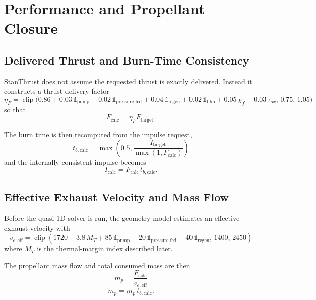 \documentclass[11pt]{article}
\newcommand{\clip}{\operatorname{clip}}
\newcommand{\mdotp}{\dot{m}_{p}}
\begin{document}
\section{Performance and Propellant Closure}
\subsection{Delivered Thrust and Burn-Time Consistency}
StanThrust does not assume the requested thrust is exactly delivered. Instead it constructs a thrust-delivery factor
\begin{equation}
\eta_F=
\clip\!\Big(
0.86
+0.03\,\mathbb{1}_{\text{pump}}
-0.02\,\mathbb{1}_{\text{pressure-fed}}
+0.04\,\mathbb{1}_{\text{regen}}
+0.02\,\mathbb{1}_{\text{film}}
+0.05\,\chi_f
-0.03\,\tau_{ox},
\,
0.75,\,
1.05
\Big)
\label{eq:thrust-delivery}
\end{equation}
so that
\begin{equation}
F_{\text{calc}}=\eta_F F_{\text{target}}.
\label{eq:calc-thrust}
\end{equation}

The burn time is then recomputed from the impulse request,
\begin{equation}
t_{b,\text{calc}}=\max\!\left(0.5,\frac{I_{\text{target}}}{\max(1,F_{\text{calc}})}\right)
\label{eq:calc-burn}
\end{equation}
and the internally consistent impulse becomes
\begin{equation}
I_{\text{calc}}=F_{\text{calc}}\,t_{b,\text{calc}}.
\label{eq:calc-impulse}
\end{equation}

\subsection{Effective Exhaust Velocity and Mass Flow}
Before the quasi-1D solver is run, the geometry model estimates an effective exhaust velocity with
\begin{equation}
v_{e,\text{eff}}
=
\clip\!\left(
1720
+3.8\,M_T
+85\,\mathbb{1}_{\text{pump}}
-20\,\mathbb{1}_{\text{pressure-fed}}
+40\,\mathbb{1}_{\text{regen}},
\,
1400,\,
2450
\right)
\label{eq:veff}
\end{equation}
where $M_T$ is the thermal-margin index described later.

The propellant mass flow and total consumed mass are then
\begin{equation}
\mdotp=\frac{F_{\text{calc}}}{v_{e,\text{eff}}}
\label{eq:mdot-total}
\end{equation}
\begin{equation}
m_p=\mdotp\,t_{b,\text{calc}}.
\label{eq:mp-total}
\end{equation}
\end{document}
